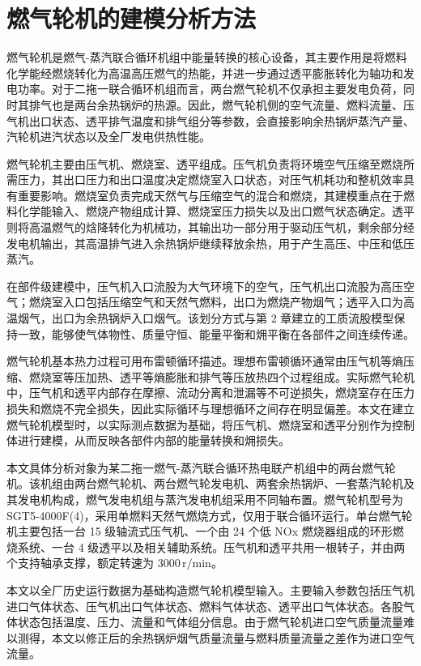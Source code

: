 \chapter{燃气轮机的建模分析方法}

燃气轮机是燃气-蒸汽联合循环机组中能量转换的核心设备，其主要作用是将燃料化学能经燃烧转化为高温高压燃气的热能，并进一步通过透平膨胀转化为轴功和发电功率。对于二拖一联合循环机组而言，两台燃气轮机不仅承担主要发电负荷，同时其排气也是两台余热锅炉的热源。因此，燃气轮机侧的空气流量、燃料流量、压气机出口状态、透平排气温度和排气组分等参数，会直接影响余热锅炉蒸汽产量、汽轮机进汽状态以及全厂发电供热性能。

燃气轮机主要由压气机、燃烧室、透平组成。压气机负责将环境空气压缩至燃烧所需压力，其出口压力和出口温度决定燃烧室入口状态，对压气机耗功和整机效率具有重要影响。燃烧室负责完成天然气与压缩空气的混合和燃烧，其建模重点在于燃料化学能输入、燃烧产物组成计算、燃烧室压力损失以及出口燃气状态确定。透平则将高温燃气的焓降转化为机械功，其输出功一部分用于驱动压气机，剩余部分经发电机输出，其高温排气进入余热锅炉继续释放余热，用于产生高压、中压和低压蒸汽。

在部件级建模中，压气机入口流股为大气环境下的空气，压气机出口流股为高压空气；燃烧室入口包括压缩空气和天然气燃料，出口为燃烧产物烟气；透平入口为高温烟气，出口为余热锅炉入口烟气。该划分方式与第 2 章建立的工质流股模型保持一致，能够使气体物性、质量守恒、能量平衡和㶲平衡在各部件之间连续传递。

燃气轮机基本热力过程可用布雷顿循环描述。理想布雷顿循环通常由压气机等熵压缩、燃烧室等压加热、透平等熵膨胀和排气等压放热四个过程组成。实际燃气轮机中，压气机和透平内部存在摩擦、流动分离和泄漏等不可逆损失，燃烧室存在压力损失和燃烧不完全损失，因此实际循环与理想循环之间存在明显偏差。本文在建立燃气轮机模型时，以实际测点数据为基础，将压气机、燃烧室和透平分别作为控制体进行建模，从而反映各部件内部的能量转换和㶲损失。

本文具体分析对象为某二拖一燃气-蒸汽联合循环热电联产机组中的两台燃气轮机。该机组由两台燃气轮机、两台燃气轮发电机、两套余热锅炉、一套蒸汽轮机及其发电机构成，燃气发电机组与蒸汽发电机组采用不同轴布置。燃气轮机型号为 SGT5-4000F(4)，采用单燃料天然气燃烧方式，仅用于联合循环运行。单台燃气轮机主要包括一台 15 级轴流式压气机、一个由 24 个低 NOx 燃烧器组成的环形燃烧系统、一台 4 级透平以及相关辅助系统。压气机和透平共用一根转子，并由两个支持轴承支撑，额定转速为 $3000\,\mathrm{r/min}$。

本文以全厂历史运行数据为基础构造燃气轮机模型输入。主要输入参数包括压气机进口气体状态、压气机出口气体状态、燃料气体状态、透平出口气体状态。各股气体状态包括温度、压力、流量和气体组分信息。由于燃气轮机进口空气质量流量难以测得，本文以修正后的余热锅炉烟气质量流量与燃料质量流量之差作为进口空气流量。

